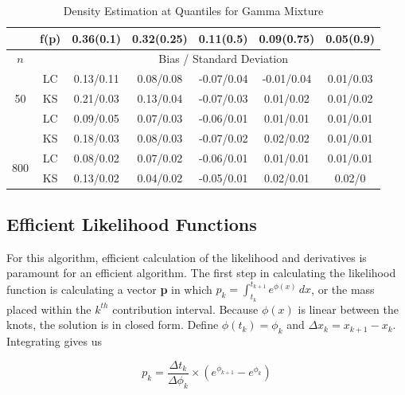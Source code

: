 \documentclass[10pt]{article}
\begin{document}
\begin{center}
\begin{table}[H]
\begin{tabular} {| c | c | c | c | c | c | c | }
\end{tabular}

\end{table}

\begin{table}[H]
\caption{Density Estimation at Quantiles for Gamma Mixture}

\begin{tabular} {| c | c | c | c | c | c | c | } 

	 \hline
		&f(p)&	0.36(0.1)&	0.32(0.25)&	0.11(0.5)&	0.09(0.75)&	0.05(0.9)\\ 
 \hline 
 	$n$ & & \multicolumn{5}{|c|}{Bias / Standard Deviation} 
 \\ 
 \hline 
\multirow{3}{*}{50}		&	LC	&0.13/0.11	&0.08/0.08	&-0.07/0.04	&-0.01/0.04	&0.01/0.03\\ 
			&	KS	&0.21/0.03	&0.13/0.04	&-0.07/0.03	&0.01/0.02	&0.01/0.02\\ 
	\hline 
\multirow{3}{*}{200}		&	LC	&0.09/0.05	&0.07/0.03	&-0.06/0.01	&0.01/0.01	&0.01/0.01\\ 
			&	KS	&0.18/0.03	&0.08/0.03	&-0.07/0.02	&0.02/0.02	&0.01/0.01\\ 
	\hline 
\multirow{3}{*}{800}		&	LC	&0.08/0.02	&0.07/0.02	&-0.06/0.01	&0.01/0.01	&0.01/0.01\\ 
			&	KS	&0.13/0.02	&0.04/0.02	&-0.05/0.01	&0.02/0.01	&0.02/0\\ 
	\hline 

\end{tabular}
\end{table}
	
\end{center}
	
	{\subsection{Efficient Likelihood Functions} } 	
	
	For this algorithm, efficient calculation of the likelihood and derivatives is paramount for an efficient algorithm. The first step in calculating the likelihood function is calculating a vector {\bf p} in which $p_k = \int_{t_k}^{t_{k+1}} e^ { \phi(x) } \,dx$, or the mass placed within the $k^{th}$ contribution interval. Because $\phi(x)$ is linear between the knots, the solution is in closed form. Define $\phi(t_k) = \phi_k$ and $\Delta x_k = x_{k+1} - x_k$. Integrating gives us 
	
	\[ p_k = \frac{\Delta t_k} {\Delta \phi_k } \times (e^{\phi_{k+1} } - e^{\phi_k } ) 
	\]
	
\end{document}
